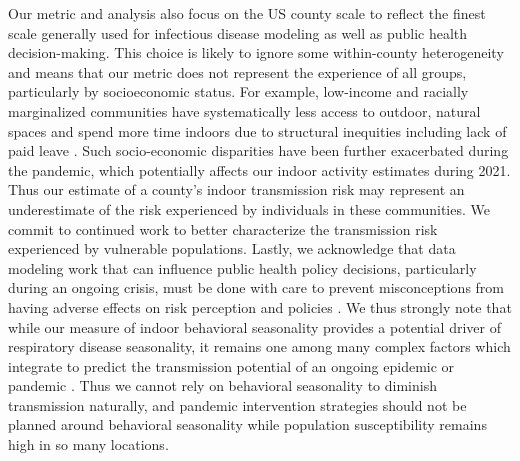\documentclass{article}
\begin{document}
Our metric and analysis also focus on the US county scale to reflect the finest scale generally used for infectious disease modeling as well as public health decision-making. This choice is likely to ignore some within-county heterogeneity and means that our metric does not represent the experience of all groups, particularly by socioeconomic status. For example, low-income and racially marginalized communities have systematically less access to outdoor, natural spaces and spend more time indoors due to structural inequities including lack of paid leave \cite{spalt2016time,nesbitt2019green,sefcik2019nature}. Such socio-economic disparities have been further exacerbated during the pandemic, which potentially affects our indoor activity estimates during 2021. Thus our estimate of a county's indoor transmission risk may represent an underestimate of the risk experienced by individuals in these communities. We commit to continued work to better characterize the transmission risk experienced by vulnerable populations.
Lastly, we acknowledge that data modeling work that can influence public health policy decisions, particularly during an ongoing crisis, must be done with care to prevent misconceptions from having adverse effects on risk perception and policies \cite{carlson2020weather}. We thus strongly note that while our measure of indoor behavioral seasonality provides a potential driver of respiratory disease seasonality, it remains one among many complex factors which integrate to predict the transmission potential of an ongoing epidemic or pandemic \cite{susswein2021ignoring}. Thus we cannot rely on behavioral seasonality to diminish transmission naturally, and pandemic intervention strategies should not be planned around behavioral seasonality while population susceptibility remains high in so many locations. 
\end{document}
